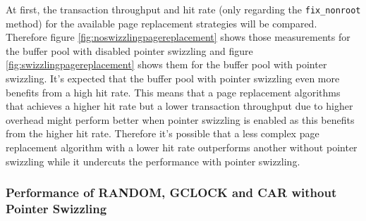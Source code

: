 	At first, the transaction throughput and hit rate (only regarding the \lstinline{fix_nonroot} method) for the available page replacement strategies will be compared. Therefore figure \ref{fig:noswizzlingpagereplacement} shows those measurements for the buffer pool with disabled pointer swizzling and figure \ref{fig:swizzlingpagereplacement} shows them for the buffer pool with pointer swizzling. It's expected that the buffer pool with pointer swizzling even more benefits from a high hit rate. This means that a page replacement algorithms that achieves a higher hit rate but a lower transaction throughput due to higher overhead might perform better when pointer swizzling is enabled as this benefits from the higher hit rate. Therefore it's possible that a less complex page replacement algorithm with a lower hit rate outperforms another without pointer swizzling while it undercuts the performance with pointer swizzling.
	
\subsubsection{Performance of RANDOM, GCLOCK and CAR without Pointer Swizzling}

